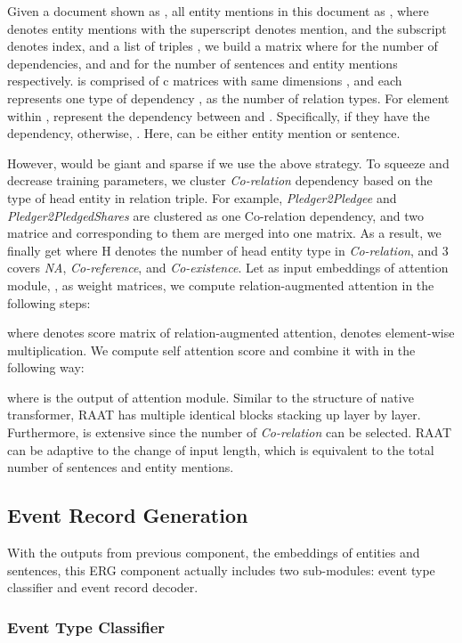 \documentclass[11pt]{article}
\begin{document}
Given a document shown as , all entity mentions in this document as , where  denotes entity mentions with the superscript  denotes mention, and the subscript  denotes index,
and a list of triples , we build a matrix  where  for the number of dependencies, and  and  for the number of sentences and entity mentions respectively.  is comprised of c matrices with same dimensions , and each  represents one type of dependency ,  as the number of relation types. For element within ,  represent the dependency between  and . Specifically,  if they have the  dependency, otherwise, . Here,  can be either entity mention or sentence.

However,  would be giant and sparse if we use the above strategy. To squeeze  and decrease training parameters, we cluster \textit{Co-relation}  dependency based on the type of head entity in relation triple. For example, \textit{Pledger2Pledgee} and \textit{Pledger2PledgedShares} are clustered as one Co-relation dependency, and two matrice  and  corresponding to them are merged into one matrix. As a result, we finally get  where H denotes the number of head entity type in \textit{Co-relation}, and 3 covers \textit{NA}, \textit{Co-reference}, and \textit{Co-existence}.
Let  as input embeddings of attention module, ,  as weight matrices,  we compute relation-augmented attention in the following steps:


where  denotes score matrix of relation-augmented attention,  denotes element-wise multiplication. We compute self attention score and combine it with  in the following way:



where  is the output of attention module. Similar to the structure of native transformer, RAAT has multiple identical blocks stacking up layer by layer. Furthermore,  is extensive since the number of \textit{Co-relation} can be selected. RAAT can be adaptive to the change of input length, which is equivalent to the total number of sentences and entity mentions.

\subsection{Event Record Generation}

With the outputs from previous component, the embeddings of entities and sentences, this ERG component actually includes two sub-modules: event type classifier and event record decoder.

\subsubsection{Event Type Classifier}
\end{document}
